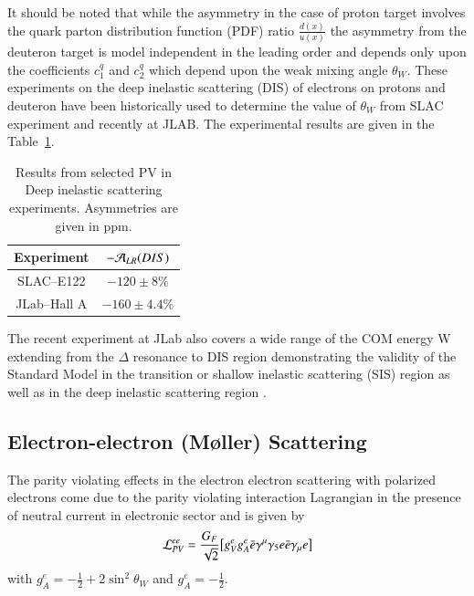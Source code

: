 It should be noted that while the asymmetry in the case of proton target involves the quark  parton distribution function (PDF) ratio $\frac{d(x)}{u(x)}$ the asymmetry from the deuteron target is  model independent in the leading order and depends only upon the coefficients $c_1^q$ and $c_2^q$ which depend upon the weak mixing angle $\theta_W$. These experiments on the deep inelastic scattering (DIS) of electrons on protons and deuteron have been historically used to determine the value of $\theta_W$ from SLAC experiment and recently at JLAB. The experimental results are given in the Table~\ref{chap9-tab5}. 
\begin{table}
\centering
\renewcommand{\arraystretch}{1.2}
\begin{tabular}{|c|c|} 
\hline
Experiment & $-{\cal A}_{LR}(DIS)$ \\ 
\hline
SLAC--E122&$-120\pm8\%$\\
\hline
JLab--Hall A&$-160\pm 4.4\%$ \\
\hline
\end{tabular}
\caption{Results from selected PV in Deep inelastic scattering experiments. Asymmetries are given in ppm.}\label{chap9-tab5}
\end{table}


The recent experiment at JLab also covers a wide range of the COM energy W extending from the $\Delta$ resonance to DIS region demonstrating the validity of the Standard Model in the transition or shallow inelastic scattering (SIS) region as well as in the deep inelastic scattering region \cite{chap9-key28}.
    
\subsection{Electron-electron (M\o ller) Scattering}\label{chap9-subsec3.4}

The parity violating effects in the electron electron scattering with polarized electrons come due to the parity violating interaction Lagrangian in the presence of neutral current in electronic sector and is given by 
\begin{equation}
{\cal L}_{PV}^{ee}= \frac{G_F}{\sqrt{2}}\big[g_V^eg_A^e  \bar{e} \gamma^\mu \gamma_5 e\bar{e}\gamma_\mu e\big] \label{chap9-eq35}
\end{equation}
 with $g_A^e =-\frac{1}{2}+2\sin^2\theta_W$ and $g_A^e=-\frac{1}{2}$.
 
